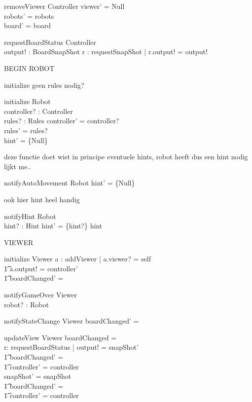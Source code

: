 \documentclass[a4paper,11pt]{article}
\begin{document}
\begin{schema}{removeViewer}
\Delta Controller 
\where
viewer' = Null \\
robots' = robots \\
board' = board
\end{schema}

\begin{schema}{requestBoardStatus}
\Xi Controller \\
output! : BoardSnapShot
\where
\exists r : requestSnapShot | r.output! = output!
\end{schema}


BEGIN ROBOT

initialize geen rules nodig?
\begin{schema}{initialize}
\Delta Robot \\
controller? : Controller \\
rules? : Rules
\where
controller' = controller? \\
rules' = rules? \\
hint' = \{Null\}
\end{schema}

deze functie doet wist in principe eventuele hints, robot heeft dus een hint nodig lijkt me..
\begin{schema}{notifyAutoMovement}
\Delta Robot
\where
hint' = \{Null\}
\end{schema}

ook hier hint heel handig
\begin{schema}{notifyHint}
\Delta Robot \\
hint? : Hint
\where
hint' = \{hint?\} \union hint
\end{schema}

VIEWER

\begin{schema}{initialize}
\Delta Viewer
\where
\exists a : addViewer | a.viewer? = self \implies \\ \t1
a.output! = controller' \\ \t1
boardChanged' = \false
\end{schema}

\begin{schema}{notifyGameOver}
\Delta Viewer \\
robot? : Robot
\where
\end{schema}

\begin{schema}{notifyStateChange}
\Delta Viewer 
\where
boardChanged' = \true
\end{schema}

\begin{schema}{updateView}
\Delta Viewer
\where
\IF boardChanged = \true \\
\THEN \exists r: requestBoardStatus | output! = snapShot' \\ \t1
boardChanged' = \false \\ \t1
controller' = controller \\ 
\ELSE snapShot' = snapShot \\ \t1
boardChanged' = \false \\ \t1
controller' = controller
\end{schema}
\end{document}

